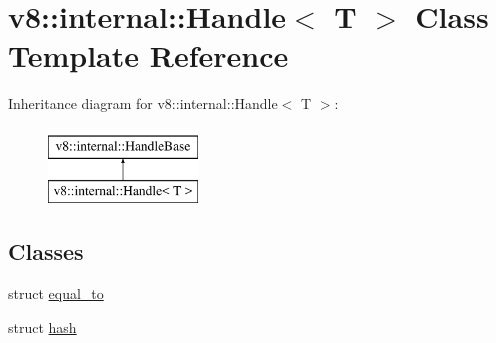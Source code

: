 \hypertarget{classv8_1_1internal_1_1Handle}{}\section{v8\+:\+:internal\+:\+:Handle$<$ T $>$ Class Template Reference}
\label{classv8_1_1internal_1_1Handle}
Inheritance diagram for v8\+:\+:internal\+:\+:Handle$<$ T $>$\+:\begin{figure}[H]
\begin{center}
\leavevmode
\includegraphics[height=2.000000cm]{classv8_1_1internal_1_1Handle}
\end{center}
\end{figure}
\subsection*{Classes}
\begin{DoxyCompactItemize}
\item 
struct \mbox{\hyperlink{structv8_1_1internal_1_1Handle_1_1equal__to}{equal\+\_\+to}}
\item 
struct \mbox{\hyperlink{structv8_1_1internal_1_1Handle_1_1hash}{hash}}
\end{DoxyCompactItemize}
